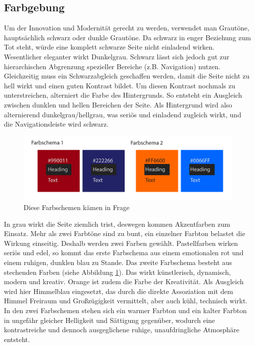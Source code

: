 	\subsection{Farbgebung\label{emo_col}}

Um der Innovation und Modernität gerecht zu werden, verwendet man Grautöne, hauptsächlich schwarz oder dunkle Grautöne. Da schwarz in enger Beziehung zum Tot steht, würde eine komplett schwarze Seite nicht einladend wirken. Wesentlicher eleganter wirkt Dunkelgrau. Schwarz lässt sich jedoch gut zur hierarchischen Abgrenzung spezieller Bereiche (z.B. Navigation) nutzen. Gleichzeitig muss ein Schwarzabgleich geschaffen werden, damit die Seite nicht zu hell wirkt und einen guten Kontrast bildet. Um diesen Kontrast nochmals zu unterstreichen, alterniert die Farbe des Hintergrunds. So entsteht ein Ausgleich zwischen dunklen und hellen Bereichen der Seite. Als Hintergrund wird also alternierend dunkelgrau/hellgrau, was seriös und einladend zugleich wirkt, und die Navigationsleiste wird schwarz. 

\begin{figure} [h]
\includegraphics[width=\textwidth]{./img/inno_col1.png}
\caption{Diese Farbschemen kämen in Frage}
\label{inno_Farbschemen1}
\end{figure}


In grau wirkt die Seite ziemlich trist, deswegen kommen Akzentfarben zum Einsatz. Mehr als zwei Farbtöne sind zu bunt, ein einzelner Farbton belastet die Wirkung einseitig. Deshalb werden zwei Farben gewählt. Pastellfarben wirken seriös und edel, so kommt das erste Farbschema aus einem emotionalen rot und einem ruhigen, dunklen blau zu Stande. Das zweite Farbschema besteht aus stechenden Farben (siehe Abbildung \ref{inno_Farbschemen1}). Das wirkt künstlerisch, dynamisch, modern und kreativ. Orange ist zudem die Farbe der Kreativität. Als Ausgleich wird hier Himmelblau eingesetzt, das durch die direkte Assoziation mit dem Himmel Freiraum und Großzügigkeit vermittelt, aber auch kühl, technisch wirkt. In den zwei Farbschemen stehen sich ein warmer Farbton und ein kalter Farbton in ungefähr gleicher Helligkeit und Sättigung gegenüber, wodurch eine kontrastreiche und dennoch ausgeglichene ruhige, unaufdringliche Atmosphäre entsteht.

